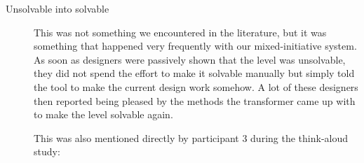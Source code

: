 \begin{description}
\item[Unsolvable into solvable] This was not something we encountered in the literature, but it was something that happened very frequently with our mixed-initiative system. As soon as designers were passively shown that the level was unsolvable, they did not spend the effort to make it solvable manually but simply told the tool to make the current design work somehow. A lot of these designers then reported being pleased by the methods the transformer came up with to make the level solvable again.

This was also mentioned directly by participant 3 during the think-aloud study: \textit{}


\end{description}
